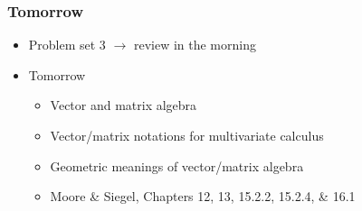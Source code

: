 \documentclass[pdflatex, 12pt]{beamer}
\begin{document}
\begin{frame}
\frametitle{Tomorrow}
\begin{itemize}
\item Problem set 3 $\rightarrow$ review in the morning
\vspace{0.4cm}
\item Tomorrow
 \begin{itemize}
 \item Vector and matrix algebra
 \item Vector/matrix notations for multivariate calculus
 \item Geometric meanings of vector/matrix algebra
 \item Moore \& Siegel, Chapters 12, 13, 15.2.2, 15.2.4, \& 16.1
 \end{itemize}
\end{itemize}
\end{frame}
\end{document}

